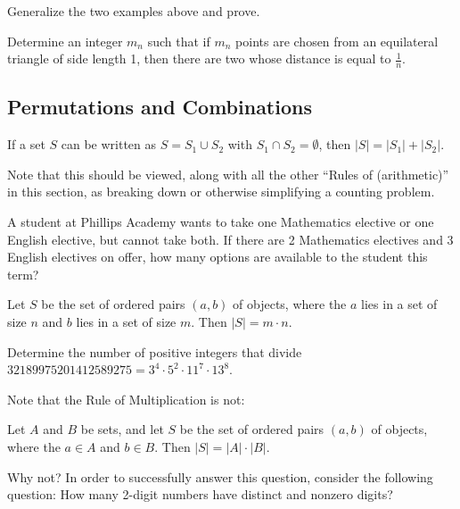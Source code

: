 \begin{exercise} Generalize the two examples above and prove.
\end{exercise}

\begin{example} Determine an integer $m_n$ such that if $m_n$ points are chosen from an equilateral triangle of side length 1, then there are two whose distance is equal to $\frac{1}{n}$.
\end{example}

\subsection{Permutations and Combinations}
\begin{theorem} If a set $S$ can be written as $S = S_1 \cup S_2$ with $S_1 \cap S_2 = \emptyset$, then $|S| = |S_1| + |S_2|$.
\end{theorem}

\begin{remark} Note that this should be viewed, along with all the other ``Rules of (arithmetic)'' in this section, as breaking down or otherwise simplifying a counting problem.
\end{remark}

\begin{example} A student at Phillips Academy wants to take one Mathematics elective or one English elective, but cannot take both.  If there are 2 Mathematics electives and 3 English electives on offer, how many options are available to the student this term?
\end{example}

\begin{theorem} Let $S$ be the set of ordered pairs $(a, b)$ of objects, where the $a$ lies in a set of size $n$ and $b$ lies in a set of size $m$.  Then $|S| = m \cdot n$.
\end{theorem}

\begin{example} Determine the number of positive integers that divide $32189975201412589275 = 3^4 \cdot 5^2 \cdot 11^7 \cdot 13^8$.
\end{example}

\begin{remark} Note that the Rule of Multiplication is not:

    Let $A$ and $B$ be sets, and let $S$ be the set of ordered pairs $(a, b)$ of objects, where the $a\in A$ and $b \in B$.  Then $|S| = |A| \cdot |B|$.

    Why not?  In order to successfully answer this question, consider the following question: How many 2-digit numbers have distinct and nonzero digits?
\end{remark}

